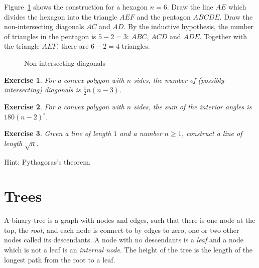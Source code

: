 \documentclass[11pt,a4paper]{report}
\newtheorem{exercise}{Exercise}
\begin{document}
Figure~\ref{fig.diag} shows the construction for a hexagon $n=6$. Draw the line $AE$ which divides the hexagon into the triangle $AEF$ and the pentagon $ABCDE$. Draw the non-intersecting diagonals $AC$ and $AD$. By the inductive hypothesis, the number of triangles in the pentagon is $5-2=3$: $ABC$, $ACD$ and $ADE$. Together with the triangle $AEF$, there are $6-2=4$ triangles.

\begin{figure}[t]
\begin{center}
\caption{Non-intersecting diagonals}\label{fig.diag}
\end{center}
\end{figure}

\begin{exercise}\label{e.diag}
For a convex polygon with $n$ sides, the number of (possibly intersecting) diagonals is $\frac{1}{2}n(n-3)$.
\end{exercise}

\begin{exercise}
For a convex polygon with $n$ sides, the sum of the interior angles is $180(n-2)^{\circ}$.
\end{exercise}

\begin{exercise}
Given a line of length $1$ and a number $n\geq 1$, construct a line of length $\sqrt n$.
\end{exercise}
Hint: Pythagoras's theorem.

\section{Trees}

A binary tree is a graph with nodes and edges, such that there is one node at the top, the \emph{root}, and each node is connect to by edges to zero, one or two other nodes called its descendants. A node with no descendants is a \emph{leaf} and a node which is not a leaf is an \emph{internal node}. The height of the tree is the length of the longest path from the root to a leaf.
\end{document}
